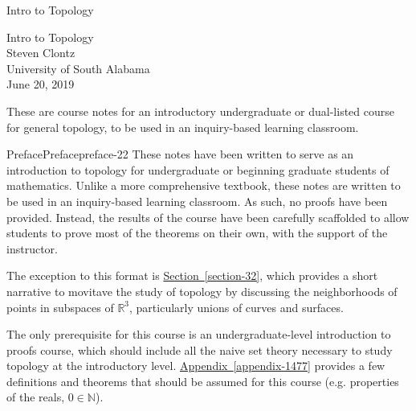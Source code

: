\documentclass[oneside,10pt,]{book}
\begin{document}
\frontmatter
\thispagestyle{empty}
{\centering
\vspace*{0.28\textheight}
{\Huge Intro to Topology}\\}
\clearpage
\thispagestyle{empty}
\null%
\clearpage
\thispagestyle{empty}
{\centering
\vspace*{0.14\textheight}
{\Huge Intro to Topology}\\[3\baselineskip]
{\Large Steven Clontz}\\[0.5\baselineskip]
{\Large University of South Alabama}\\[3\baselineskip]
{\Large June 20, 2019}\\}
\clearpage
\thispagestyle{empty}
\hypertarget{colophon-15}{}
\null\clearpage
\hypertarget{p-14}{}%
These are course notes for an introductory undergraduate or dual-listed course for general topology, to be used in an inquiry-based learning classroom.%
%
%
\typeout{************************************************}
\typeout{************************************************}
%
\begin{preface}{Preface}{}{Preface}{}{}{preface-22}
\hypertarget{p-23}{}%
These notes have been written to serve as an introduction to topology for undergraduate or beginning graduate students of mathematics. Unlike a more comprehensive textbook, these notes are written to be used in an inquiry-based learning classroom. As such, no proofs have been provided. Instead, the results of the course have been carefully scaffolded to allow students to prove most of the theorems on their own, with the support of the instructor.%
\par
\hypertarget{p-24}{}%
The exception to this format is \hyperref[section-32]{Section~\ref{section-32}}, which provides a short narrative to movitave the study of topology by discussing the neighborhoods of points in subspaces of \(\mathbb R^3\), particularly unions of curves and surfaces.%
\par
\hypertarget{p-27}{}%
The only prerequisite for this course is an undergraduate-level introduction to proofs course, which should include all the naive set theory necessary to study topology at the introductory level. \hyperref[appendix-1477]{Appendix~\ref{appendix-1477}} provides a few definitions and theorems that should be assumed for this course (e.g. properties of the reals, \(0\in\mathbb N\)).%
\end{preface}
\end{document}
